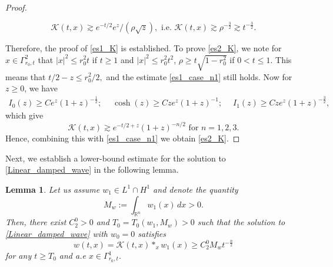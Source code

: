 \documentclass[11pt,reqno]{amsart}
\newtheorem{lemma}{Lemma}[section]
\begin{document}
\begin{proof}
\begin{itemize}[leftmargin=*]
			\[
			\mathcal{K}(t,x)\gtrsim e^{-t/2}e^z/(\rho \sqrt{z}),\text{ i.e. }\mathcal{K}(t,x)\gtrsim \rho^{-\frac{3}{2}}\gtrsim t^{-\frac{3}{2}}.
			\]
		\end{itemize}
		Therefore, the proof of \eqref{es1_K} is established. To prove \eqref{es2_K}, we note for $x\in \Gamma^2_{r_0,t}$ that $|x|^2\leq r^2_0 t$ if $t\geq 1$ and $|x|^2\leq r^2_0t^2$, $\rho\geq t\sqrt{1-r^2_0}$ if $0<t\leq 1$. This means that $t/2-z\leq r_0^2/2,$ and the estimate \eqref{es1_case_n1} still holds. Now for $z\geq 0$, we have
		\begin{align*}
			I_{0}(z)\geq Ce^z(1+z)^{-\frac{1}{2}};\;\quad \cosh(z)\geq Cze^z(1+z)^{-1};\;\quad I_{1}(z)\geq Cze^z(1+z)^{-\frac{3}{2}},
		\end{align*}
		which give
		\[
		\mathcal{K}(t,x)\gtrsim e^{-t/2+z}(1+z)^{-n/2} \text{ for }n=1,2,3.
		\]
		Hence, combining this with \eqref{es1_case_n1} we obtain \eqref{es2_K}.
	\end{proof}
	\noindent Next, we establish a lower-bound estimate for the solution to \eqref{Linear_damped_wave} in the following lemma.
	\begin{lemma}\label{lem_lowerbound_heatkernel}
		Let us assume $w_1\in L^1\cap H^1$ and denote the quantity 
		\[
		M_w:=\int_{\mathbb{R}^n}w_1(x)\,dx>0.
		\]
		Then, there exist $C^0_2>0$ and $T_0=T_0(w_1,M_w)>0$ such that the solution to \eqref{Linear_damped_wave} with $w_0=0$ satisfies
		\[
		w(t,x)=\mathcal{K}(t,x)\ast_x w_1(x)\geq C^0_2M_wt^{-\frac{n}{2}}
		\]
		for any $t\geq T_0$ and a.e $x\in\Gamma^1_{r_0,t}$. 
		
	\end{lemma}
\end{document}
